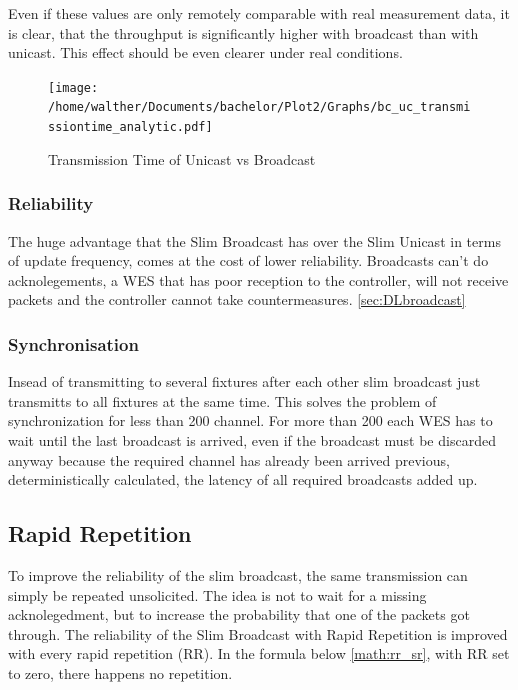 Even if these values are only remotely comparable with real measurement data, it is clear,
that the throughput is significantly higher with broadcast than with unicast.
This effect should be even clearer under real conditions.

\begin{figure}[h]
	\centering
	\texttt{[image: /home/walther/Documents/bachelor/Plot2/Graphs/bc\_uc\_transmissiontime\_analytic.pdf]}
	\caption{Transmission Time of Unicast vs Broadcast}
	\label{fig:bc_uc_transmissiontime_analytic}
\end{figure}

\subsubsection*{Reliability}

The huge advantage that the Slim Broadcast has over the Slim Unicast in terms of update frequency,
comes at the cost of lower reliability.
Broadcasts can't do acknolegements,
a WES that has poor reception to the controller, will not receive packets and the controller cannot take countermeasures.
\cref{sec:DLbroadcast}

\subsubsection*{Synchronisation}
Insead of transmitting to several fixtures after each other slim broadcast just transmitts to all fixtures at the same time.
This solves the problem of synchronization for less than 200 channel.
For more than 200 each WES has to wait until the last broadcast is arrived, 
even if the broadcast must be discarded anyway because the required channel has already been arrived previous,
deterministically calculated, the latency of all required broadcasts added up.

\subsection*{Rapid Repetition}


To improve the reliability of the slim broadcast, the same transmission can simply be repeated unsolicited.
The idea is not to wait for a missing acknolegedment, but to increase the probability that one of the packets got through.
The reliability of the Slim Broadcast with Rapid Repetition is improved with every rapid repetition (RR).
In the formula below \cref{math:rr_sr}, with RR set to zero, there happens no repetition.

